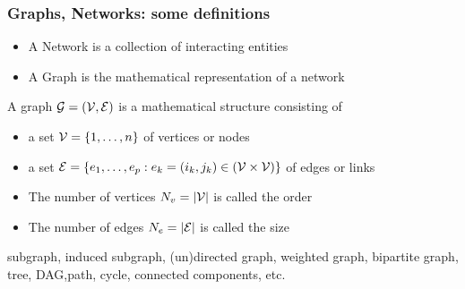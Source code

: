 \documentclass{beamer}\usepackage[]{graphicx}\usepackage[]{color}
\begin{document}
\begin{frame}
  \frametitle{Graphs, Networks: some definitions}

  \begin{definition}
    \vspace{-.25cm}
    \begin{itemize}
      \item  A \alert{Network} is a collection of interacting entities
      \item  A \alert{Graph} is the mathematical representation of a network
    \end{itemize}
  \end{definition}

  \vfill

  \begin{definition}[Graph]
    A graph $\mathcal{G}=(\mathcal{V},\mathcal{E})$ is a mathematical structure consisting of
    \begin{itemize}
      \item a set $\mathcal{V}=\left\{1,\dots,n\right\}$ of \alert{vertices} or \alert{nodes} 
      \item a set $\mathcal{E}=\left\{e_1,\dots,e_p:e_k=(i_k,j_k)\in (\mathcal{V}\times\mathcal{V})\right\}$ of \alert{edges} or \alert{links} 
      \item The number of vertices $N_v=|\mathcal{V}|$ is called the \alert{order}
      \item The number of edges $N_e=|\mathcal{E}|$ is called the \alert{size}
    \end{itemize}
  \end{definition}

  \vfill

  \begin{definition}[Vocabulary]
  subgraph,  induced subgraph, (un)directed graph, 
  weighted graph, bipartite graph, tree, DAG,path, cycle, connected components, etc.
  \end{definition}

\end{frame}
\end{document}
